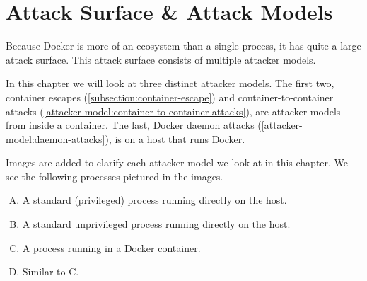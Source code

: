 \chapter{Attack Surface \& Attack Models}\label{chapter:attack-surface-models}
Because Docker is more of an ecosystem than a single process, it has quite a large attack surface. This attack surface consists of multiple attacker models.

\medskip

In this chapter we will look at three distinct attacker models. The first two, container escapes (\autoref{subsection:container-escape}) and container-to-container attacks (\autoref{attacker-model:container-to-container-attacks}), are attacker models from inside a container. The last, Docker daemon attacks (\autoref{attacker-model:daemon-attacks}), is on a host that runs Docker.

\medskip

Images are added to clarify each attacker model we look at in this chapter. We see the following processes pictured in the images.
\begin{enumerate}[A.]
    \item A standard (privileged) process running directly on the host.
    \item A standard unprivileged process running directly on the host.
    \item A process running in a Docker container.
    \item Similar to C.
\end{enumerate}




